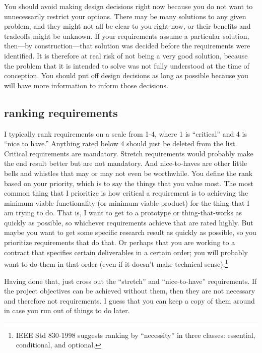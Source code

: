 \documentclass[12pt,oneside]{book}
\begin{document}
You should avoid making design decisions right now because you do not want to unnecessarily restrict your options. There may be many solutions to any given problem, and they might not all be clear to you right now, or their benefits and tradeoffs might be unknown. If your requirements assume a particular solution, then---by construction---that solution was decided before the requirements were identified. It is therefore at real risk of not being a very good solution, because the problem that it is intended to solve was not fully understood at the time of conception. You should put off design decisions as long as possible because you will have more information to inform those decisions.


\subsection*{ranking requirements}

I typically rank requirements on a scale from 1-4, where 1 is ``critical'' and 4 is ``nice to have.'' Anything rated below 4 should just be deleted from the list. Critical requirements are mandatory. Stretch requirements would probably make the end result better but are not mandatory. And nice-to-haves are other little bells and whistles that may or may not even be worthwhile. You define the rank based on your priority, which is to say the things that you value most. The most common thing that I prioritize is how critical a requirement is to achieving the minimum viable functionality (or minimum viable product) for the thing that I am trying to do. That is, I want to get to a prototype or thing-that-works as quickly as possible, so whichever requirements achieve that are rated highly. But maybe you want to get some specific research result as quickly as possible, so you prioritize requirements that do that. Or perhaps that you are working to a contract that specifies certain deliverables in a certain order; you will probably want to do them in that order (even if it doesn't make technical sense).\footnote{IEEE Std 830-1998 suggests ranking by ``necessity'' in three classes: essential, conditional, and optional.}

Having done that, just cross out the ``stretch'' and ``nice-to-have'' requirements. If the project objectives can be achieved without them, then they are not necessary and therefore not requirements. I guess that you can keep a copy of them around in case you run out of things to do later.
\end{document}
